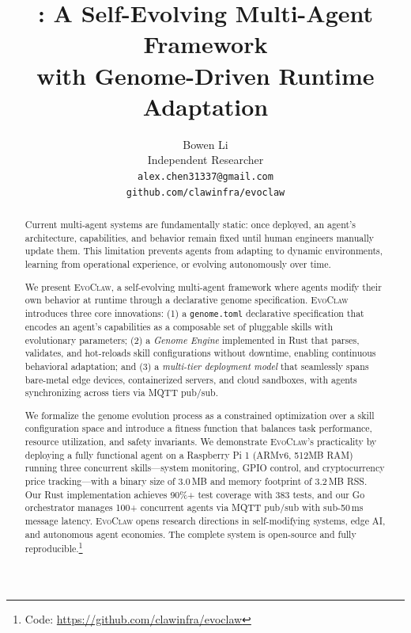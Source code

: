 \documentclass{article}
\title{\evoclaw{}: A Self-Evolving Multi-Agent Framework \\with Genome-Driven Runtime Adaptation}
\author{
  Bowen Li \\
  Independent Researcher \\
  \texttt{alex.chen31337@gmail.com} \\
  \texttt{github.com/clawinfra/evoclaw}
}
\newcommand{\evoclaw}{\textsc{EvoClaw}}
\newcommand{\genome}{\texttt{genome.toml}}
\begin{document}
\maketitle

\begin{abstract}
Current multi-agent systems are fundamentally static: once deployed, an agent's architecture, capabilities, and behavior remain fixed until human engineers manually update them. This limitation prevents agents from adapting to dynamic environments, learning from operational experience, or evolving autonomously over time.

We present \evoclaw{}, a self-evolving multi-agent framework where agents modify their own behavior at runtime through a declarative genome specification. \evoclaw{} introduces three core innovations: (1) a \genome{} declarative specification that encodes an agent's capabilities as a composable set of pluggable skills with evolutionary parameters; (2) a \textit{Genome Engine} implemented in Rust that parses, validates, and hot-reloads skill configurations without downtime, enabling continuous behavioral adaptation; and (3) a \textit{multi-tier deployment model} that seamlessly spans bare-metal edge devices, containerized servers, and cloud sandboxes, with agents synchronizing across tiers via MQTT pub/sub.

We formalize the genome evolution process as a constrained optimization over a skill configuration space and introduce a fitness function that balances task performance, resource utilization, and safety invariants. We demonstrate \evoclaw{}'s practicality by deploying a fully functional agent on a Raspberry Pi 1 (ARMv6, 512MB RAM) running three concurrent skills---system monitoring, GPIO control, and cryptocurrency price tracking---with a binary size of 3.0\,MB and memory footprint of 3.2\,MB RSS. Our Rust implementation achieves 90\%+ test coverage with 383 tests, and our Go orchestrator manages 100+ concurrent agents via MQTT pub/sub with sub-50\,ms message latency. \evoclaw{} opens research directions in self-modifying systems, edge AI, and autonomous agent economies. The complete system is open-source and fully reproducible.\footnote{Code: \url{https://github.com/clawinfra/evoclaw}}
\end{abstract}


\end{document}
